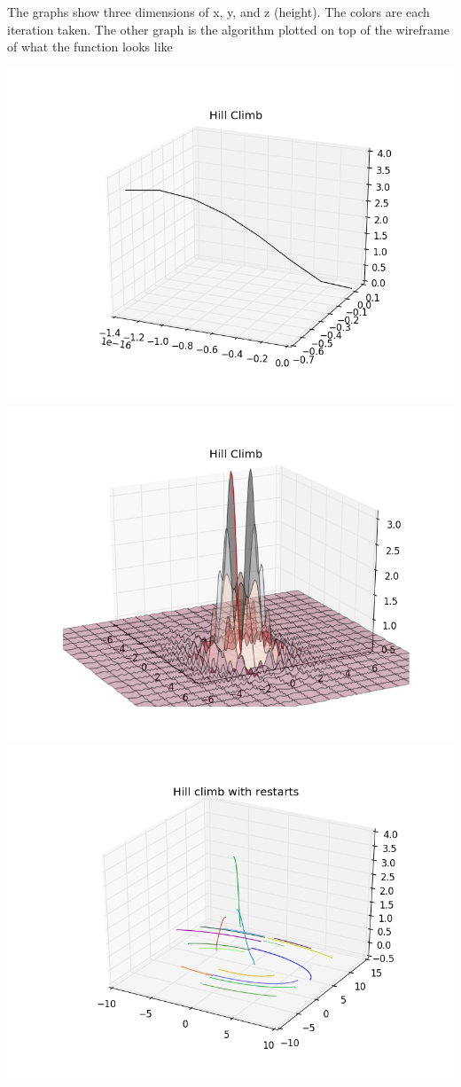 \documentclass[letter,12pt]{article}
\begin{document}
The graphs show three dimensions of x, y, and z (height). The colors are each iteration taken. The other graph is the algorithm plotted on top of the wireframe of what the function looks like

\includegraphics[scale=0.35]{hill_climb}
\includegraphics[scale=0.35]{hill_climb_graph}
\includegraphics[scale=0.35]{hill_climb_random}
\end{document}
